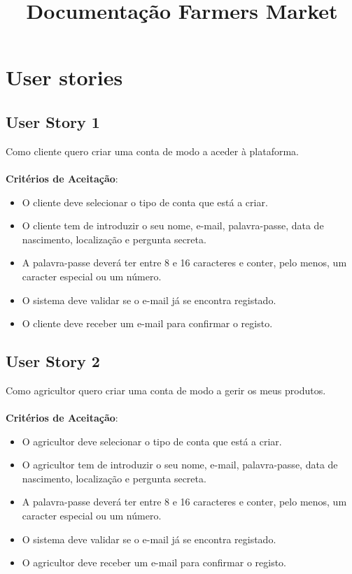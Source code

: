 \documentclass[a4paper,11pt]{article}
\title{Documentação Farmers Market}
\author{}
\date{}
\begin{document}
\maketitle
\vspace{-67pt}

\section{User stories}
\subsection{User Story 1}
Como cliente quero criar uma conta de modo a aceder à plataforma.\\\\
\textbf{Critérios de Aceitação}:
\begin{itemize}
  \item O cliente deve selecionar o tipo de conta que está a criar.
  \item O cliente tem de introduzir o seu nome, e-mail, palavra-passe, data de nascimento, localização e pergunta secreta.
  \item A palavra-passe deverá ter entre 8 e 16 caracteres e conter, pelo menos, um caracter especial ou um número.
  \item O sistema deve validar se o e-mail já se encontra registado.
  \item O cliente deve receber um e-mail para confirmar o registo.
\end{itemize}
\subsection{User Story 2}
Como agricultor quero criar uma conta de modo a gerir os meus produtos.\\\\
\textbf{Critérios de Aceitação}:
\begin{itemize}
  \item O agricultor deve selecionar o tipo de conta que está a criar.
  \item O agricultor tem de introduzir o seu nome, e-mail, palavra-passe, data de nascimento, localização e pergunta secreta.
  \item A palavra-passe deverá ter entre 8 e 16 caracteres e conter, pelo menos, um caracter especial ou um número.
  \item O sistema deve validar se o e-mail já se encontra registado.
  \item O agricultor deve receber um e-mail para confirmar o registo.
\end{itemize}
\end{document}

